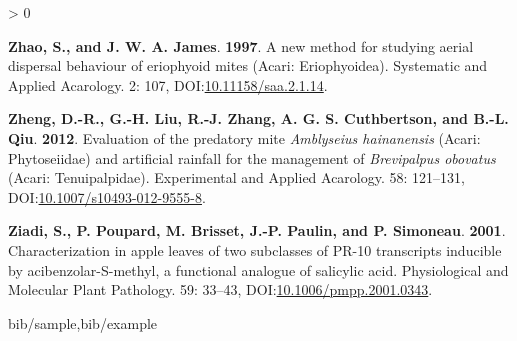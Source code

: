 \documentclass[12pt,final,CPage]{ufthesis}
\newlength{\cslhangindent}
\newenvironment{CSLReferences}[2] %
{%
	\setlength{\parindent}{0pt}
	\ifodd #1 \everypar{\setlength{\hangindent}{\cslhangindent}}\ignorespaces\fi
	\ifnum #2 > 0
	\setlength{\parskip}{#2\baselineskip}
	\fi
}%
{}
\begin{document}
{\begin{CSLReferences}{1}{0}
  \leavevmode{}%
  \textbf{Zhao, S., and J. W. A. James}. \textbf{1997}. A new method for studying aerial dispersal behaviour of eriophyoid mites ({Acari}: {Eriophyoidea}). Systematic and Applied Acarology. 2: 107, DOI:\href{https://doi.org/10.11158/saa.2.1.14}{10.11158/saa.2.1.14}.

  \leavevmode{}%
  \textbf{Zheng, D.-R., G.-H. Liu, R.-J. Zhang, A. G. S. Cuthbertson, and B.-L. Qiu}. \textbf{2012}. Evaluation of the predatory mite {\emph{Amblyseius hainanensis}} ({Acari}: {Phytoseiidae}) and artificial rainfall for the management of {\emph{Brevipalpus obovatus}} ({Acari}: {Tenuipalpidae}). Experimental and Applied Acarology. 58: 121--131, DOI:\href{https://doi.org/10.1007/s10493-012-9555-8}{10.1007/s10493-012-9555-8}.

  \leavevmode{}%
  \textbf{Ziadi, S., P. Poupard, M. Brisset, J.-P. Paulin, and P. Simoneau}. \textbf{2001}. Characterization in apple leaves of two subclasses of {PR}-10 transcripts inducible by acibenzolar-{S}-methyl, a functional analogue of salicylic acid. Physiological and Molecular Plant Pathology. 59: 33--43, DOI:\href{https://doi.org/10.1006/pmpp.2001.0343}{10.1006/pmpp.2001.0343}.

  \end{CSLReferences}
 {bib/sample,bib/example}

\end{document}
